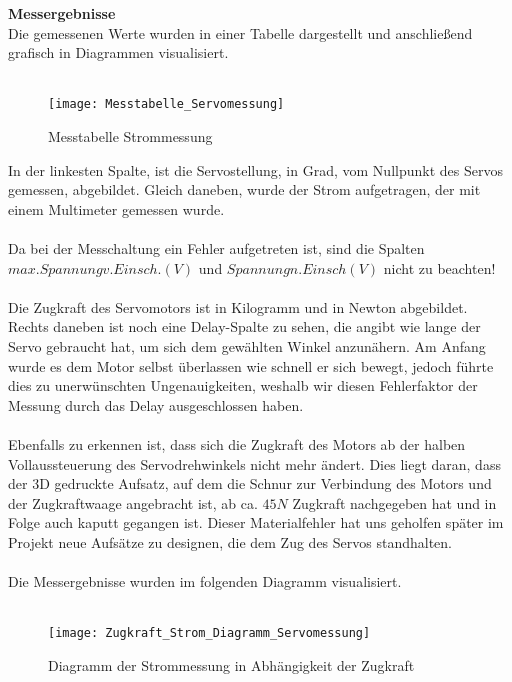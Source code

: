 \documentclass[titlepage,12pt,twoside]{article}
\begin{document}
\hfill \break
\textbf{Messergebnisse}\\
Die gemessenen Werte wurden in einer Tabelle dargestellt und anschließend grafisch in Diagrammen visualisiert. \\
\\
\begin{figure}[H]
	\begin{center}
		\scalebox{1.3}
		{\texttt{[image: Messtabelle\_Servomessung]}}
		\caption{Messtabelle Strommessung}
		\label{fig:Messtabelle_Servomessung}		
	\end{center}
\end{figure}
\hfill \break
In der linkesten Spalte, ist die Servostellung, in Grad, vom Nullpunkt des Servos gemessen, abgebildet. Gleich daneben, wurde 
der Strom aufgetragen, der mit einem Multimeter gemessen wurde. \\
\\
Da bei der Messchaltung ein Fehler aufgetreten ist, sind die Spalten $max. Spannung v. Einsch. (V)$ und $Spannung n. Einsch(V)$
nicht zu beachten! \\
\\
Die Zugkraft des Servomotors ist in Kilogramm und in Newton abgebildet. Rechts daneben ist noch eine Delay-Spalte zu sehen, die
angibt wie lange der Servo gebraucht hat, um sich dem gewählten Winkel anzunähern. Am Anfang wurde es dem Motor selbst überlassen
wie schnell er sich bewegt, jedoch führte dies zu unerwünschten Ungenauigkeiten, weshalb wir diesen Fehlerfaktor der Messung durch 
das Delay ausgeschlossen haben. \\
\\
Ebenfalls zu erkennen ist, dass sich die Zugkraft des Motors ab der halben Vollaussteuerung des Servodrehwinkels nicht mehr ändert.
Dies liegt daran, dass der 3D gedruckte Aufsatz, auf dem die Schnur zur Verbindung des Motors und der Zugkraftwaage angebracht ist,
ab ca. $45N$ Zugkraft nachgegeben hat und in Folge auch kaputt gegangen ist. Dieser Materialfehler hat uns geholfen später im
Projekt neue Aufsätze zu designen, die dem Zug des Servos standhalten. \\
\\
Die Messergebnisse wurden im folgenden Diagramm visualisiert. \\
\\
\begin{figure}[H]
	\begin{center}
		\scalebox{1.0}
		{\texttt{[image: Zugkraft\_Strom\_Diagramm\_Servomessung]}}
		\caption{Diagramm der Strommessung in Abhängigkeit der Zugkraft}
		\label{fig:Zugkraft_Strom_Diagramm_Servomessung}	
	\end{center}
\end{figure}
\end{document}
